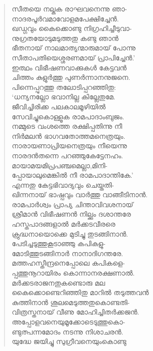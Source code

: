\begin{verse}
സീതയെ നല്കുക രാഘവനെന്നു ഞാ-\\
നാദരപൂര്‍വമാവോളമപേക്ഷിച്ചേന്‍.\\
ഖഡ്ഗവും കൈക്കൊണ്ടു നിഗ്രഹിച്ചീടുവാ-\\
നുഗ്രതയോടുമടുത്തതു കണ്ടു ഞാന്‍\\
ഭീതനായ് നാലമാത്യന്മാരുമായ് പോന്നു\\
സീതാപതിയെശ്ശരണമായ് പ്രാപിച്ചേന്‍.’\\
ഇത്ഥം വിഭീഷണവാക്കുകള്‍ കേട്ടവന്‍\\
ചിത്തം കുളുര്‍ത്തു പുണര്‍ന്നാനനുജനെ.\\
പിന്നെപ്പുറത്തു തലോടിപ്പറഞ്ഞിതു:\\
‘ധന്യനല്ലോ ഭവാനില്ല കില്ലേതുമേ.\\
ജീവിച്ചിരിക്ക പലകാലമൂഴിയില്‍\\
സേവിച്ചുകൊള്ളൂക രാമപാദാംബുജം.\\
നമ്മുടെ വംശത്തെ രക്ഷിപ്പതിന്നു നീ\\
നിര്‍മലന്‍ ഭാഗവതോത്തമനെത്രയും.\\
നാരായണാപ്രിയനെത്രയും നീയെന്നു\\
നാരദന്‍തന്നെ പറഞ്ഞുകേട്ടേനഹം.\\
മായാമയമിപ്രപഞ്ചമെല്ലാ,മിനി-\\
പ്പോയാലുമെങ്കില്‍ നീ രാമപാദാന്തികേ.’\\
എന്നതു കേട്ടഭിവാദ്യവും ചെയ്തതി-\\
ഖിന്നനായ് ഭാഷ്പവും വാര്‍ത്തു വാങ്ങീടിനാന്‍.\\
രാമപാര്‍ശ്വം പ്രാപ്യ ചിന്താവിവശനായ്\\
ശ്രീമാന്‍ വിഭീഷണന്‍ നില്ക്കും ദശാന്തരേ\\
ഹസ്തപാദങ്ങളാല്‍ മര്‍ക്കടവീരരെ\\
ക്രുദ്ധനായൊക്കെ മുടിച്ചു തുടങ്ങിനാന്‍.\\
പേടിച്ചടുത്തുകൂടാഞ്ഞു കപികളു-\\
മോടിത്തുടങ്ങിനാര്‍ നാനാദിഗന്തരേ.\\
മത്തഹസ്തീന്ദ്രനെപ്പോലെ കപികളെ-\\
പ്പത്തുനൂറായിരം കൊന്നാനരക്ഷണാല്‍.\\
മര്‍ക്കടരാജനതുകണ്ടൊരു മല\\
കൈക്കൊണ്ടെറിഞ്ഞിതു മാറില്‍ തടുത്തവന്‍\\
കുത്തിനാന്‍ ശൂലമെടുത്തതുകൊണ്ടതി-\\
വിത്രസ്തനായ് വീണു മോഹിച്ചിതര്‍ക്കജന്‍.\\
അപ്പോളവനെയുമൂക്കോടെടുത്തുകൊ-\\
ണ്ടുത്പന്നമോദം നടന്നു നിശാചരന്‍.\\
യുദ്ധേ ജയിച്ചു സുഗ്രീവനെയുംകൊണ്ടു\\

\end{verse}
